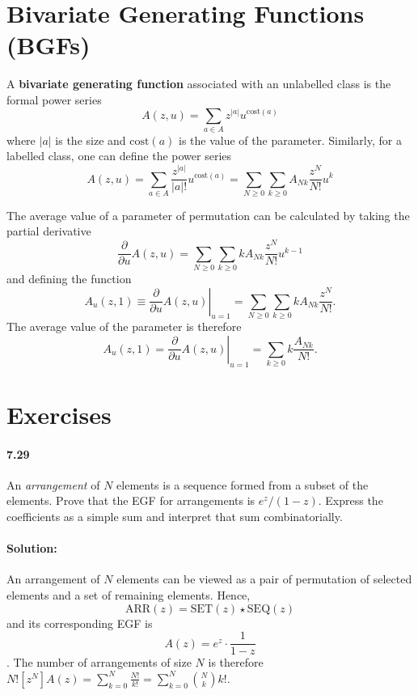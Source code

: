 \documentclass{article}
\begin{document}
\section{Bivariate Generating Functions (BGFs)}

A \textbf{bivariate generating function} associated with an unlabelled class
is the formal power series \begin{equation*}
  A(z, u) = \sum_{a \in A} z^{|a|}u^{\mathrm{cost}(a)}
\end{equation*} where $|a|$ is the size and $\mathrm{cost}(a)$ is the value of
the parameter. Similarly, for a labelled class, one can define the power series
\begin{equation*}
  A(z, u) = \sum_{a \in A} \frac{z^{|a|}}{|a|!}u^{\mathrm{cost}(a)} =
  \sum_{N \geq 0} \sum_{k \geq 0} A_{Nk}\frac{z^N}{N!}u^k \end{equation*}

The average value of a parameter of permutation can be calculated by taking
the partial derivative \begin{equation*}
  \frac{\partial}{\partial u} A(z, u) = \sum_{N \geq 0} \sum_{k \geq 0} kA_{Nk}
  \frac{z^N}{N!}u^{k - 1}
\end{equation*} and defining the function \begin{equation*}
  A_u(z, 1) \equiv \left.\frac{\partial}{\partial u}A(z, u)\right|_{u = 1} =
  \sum_{N \geq 0} \sum_{k \geq 0} kA_{Nk}\frac{z^N}{N!}.
\end{equation*} The average value of the parameter is therefore
\begin{equation*}
  [z^N]A_u(z, 1) = \left.\frac{\partial}{\partial u}A(z, u)\right|_{u = 1} =
  \sum_{k \geq 0} k\frac{A_{Nk}}{N!}.
\end{equation*}

\section*{Exercises}

\paragraph{7.29} An \emph{arrangement} of $N$ elements is a sequence formed
from a subset of the elements. Prove that the EGF for arrangements is $e^z/(1 -
z)$. Express the coefficients as a simple sum and interpret that sum
combinatorially.

\paragraph{Solution:} An arrangement of $N$ elements can be viewed as a pair of
permutation of selected elements and a set of remaining elements. Hence,
\begin{equation*}
  \mathrm{ARR}(z) = \mathrm{SET}(z) \star \mathrm{SEQ}(z)
\end{equation*} and its corresponding EGF is \begin{equation*}
  A(z) = e^z \cdot \frac{1}{1 - z}
\end{equation*}. The number of arrangements of size $N$ is therefore
$N![z^N]A(z) = \sum_{k = 0}^N \frac{N!}{k!} = \sum_{k = 0}^N \binom{N}{k}k!$.
\end{document}
